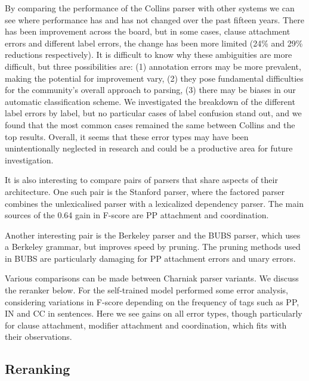 By comparing the performance of the Collins parser with other systems we can see where performance has and has not changed over the past fifteen years.
There has been improvement across the board, but in some cases, \myeg clause attachment errors and different label errors, the change has been more limited (24\% and 29\% reductions respectively).
It is difficult to know why these ambiguities are more difficult, but three possibilities are:
(1) annotation errors may be more prevalent, making the potential for improvement vary,
(2) they pose fundamental difficulties for the community's overall approach to parsing,
(3) there may be biases in our automatic classification scheme.
We investigated the breakdown of the different label errors by label, but no particular cases of label confusion stand out, and we found that the most common cases remained the same between Collins and the top results.
Overall, it seems that these error types may have been unintentionally neglected in research and could be a productive area for future investigation.

It is also interesting to compare pairs of parsers that share aspects of their
architecture.  One such pair is the Stanford parser, where the factored parser
combines the unlexicalised parser with a lexicalized dependency parser.  The
main sources of the 0.64 gain in F-score are PP attachment and coordination.

Another interesting pair is the Berkeley parser and the BUBS parser, which uses
a Berkeley grammar, but improves speed by pruning.  The pruning methods used in
BUBS are particularly damaging for PP attachment errors and unary errors.

Various comparisons can be made between Charniak parser variants.  We discuss
the reranker below.  For the self-trained model
\textcite{McClosky-Charniak-Johnson:2006} performed some error analysis,
considering variations in F-score depending on the frequency of tags such as
PP, IN and CC in sentences.  Here we see gains on all error types, though
particularly for clause attachment, modifier attachment and coordination, which
fits with their observations.

\subsection{Reranking}

